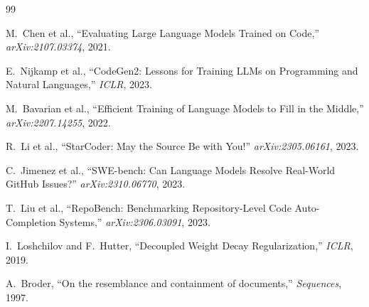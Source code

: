 \documentclass[11pt,a4paper]{article}
\begin{document}
\begin{thebibliography}{99}

M.~Chen et al., ``Evaluating Large Language Models Trained on Code,''
\textit{arXiv:2107.03374}, 2021.

E.~Nijkamp et al., ``CodeGen2: Lessons for Training LLMs on Programming and Natural Languages,''
\textit{ICLR}, 2023.

M.~Bavarian et al., ``Efficient Training of Language Models to Fill in the Middle,''
\textit{arXiv:2207.14255}, 2022.

R.~Li et al., ``StarCoder: May the Source Be with You!'' \textit{arXiv:2305.06161}, 2023.

C.~Jimenez et al., ``SWE-bench: Can Language Models Resolve Real-World GitHub Issues?''
\textit{arXiv:2310.06770}, 2023.

T.~Liu et al., ``RepoBench: Benchmarking Repository-Level Code Auto-Completion Systems,''
\textit{arXiv:2306.03091}, 2023.

I.~Loshchilov and F.~Hutter, ``Decoupled Weight Decay Regularization,'' \textit{ICLR}, 2019.

A.~Broder, ``On the resemblance and containment of documents,'' \textit{Sequences}, 1997.

\end{thebibliography}
\end{document}
